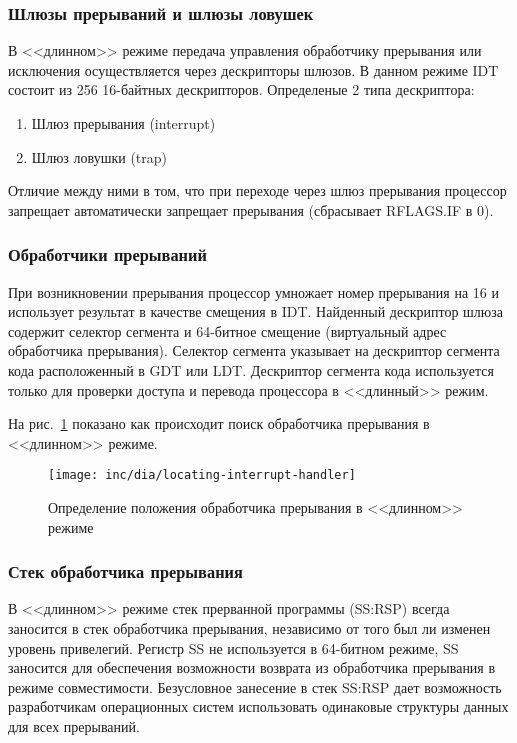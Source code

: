 \subsubsection*{Шлюзы прерываний и шлюзы ловушек}
В <<длинном>> режиме передача управления обработчику прерывания или исключения
осуществляется через дескрипторы шлюзов. В данном режиме IDT состоит из 256
16-байтных дескрипторов. Определеные 2 типа дескриптора:
\begin{enumerate}
\item Шлюз прерывания (interrupt)
\item Шлюз ловушки (trap)
\end{enumerate}

Отличие между ними в том, что при переходе через шлюз прерывания процессор
запрещает автоматически запрещает прерывания (сбрасывает RFLAGS.IF в 0).

\subsubsection*{Обработчики прерываний}
При возникновении прерывания процессор умножает номер прерывания на 16 и
использует результат в качестве смещения в IDT. Найденный дескриптор шлюза
содержит селектор сегмента и 64-битное смещение (виртуальный адрес обработчика
прерывания). Селектор сегмента указывает на дескриптор сегмента кода
расположенный в GDT или LDT. Дескриптор сегмента кода используется только для
проверки доступа и перевода процессора в <<длинный>> режим.

На рис.~\ref{fig:locating_interrupt_handler} показано как происходит поиск
обработчика прерывания в <<длинном>> режиме.

\begin{figure}
  \centering
  \texttt{[image: inc/dia/locating-interrupt-handler]}
  \caption{Определение положения обработчика прерывания в <<длинном>> режиме}
  \label{fig:locating_interrupt_handler}
\end{figure}


\subsubsection*{Стек обработчика прерывания}
В <<длинном>> режиме стек прерванной программы (SS:RSP) всегда заносится в
стек обработчика прерывания, независимо от того был ли изменен уровень
привелегий. Регистр SS не используется в 64-битном режиме, SS заносится для
обеспечения возможности возврата из обработчика прерывания в режиме
совместимости. Безусловное занесение в стек SS:RSP дает возможность
разработчикам операционных систем использовать одинаковые структуры данных для
всех прерываний.

